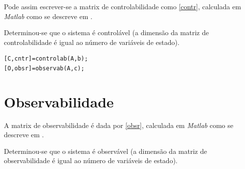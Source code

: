 \documentclass[%
  reprint,
  nofootinbib,
  amsmath,amssymb,
  aps,
  10pt,
  a4paper
]{revtex4-1}
\begin{document}

Pode assim escrever-se a matrix de controlabilidade como \eqref{contr}, calculada em {\it Matlab} como se descreve em .


Determinou-se que o sistema é controlável (a dimensão da matriz de controlabilidade é igual ao número de variáveis de estado).

\begin{lstlisting}[label=list1, caption={Código Matlab para o cálculo da matrix de controlabilidade $\mathcal{C}$ e de observabilidade $\mathcal{O}$. As variáveis {\it cntr} e {\it obsr} adquirem valores booleanos, que indicam se o sistema é controlável e/ou observável, respectivamente. As funções {\it controlab} e {\it observab} apresentam-se em anexo em ficheiros com o mesmo nome.}]
[C,cntr]=controlab(A,b);
[O,obsr]=observab(A,c);
\end{lstlisting}


\section{Observabilidade}
A matrix de observabilidade é dada por \eqref{obsr}, calculada em {\it Matlab} como se descreve em .


Determinou-se que o sistema é observável (a dimensão da matriz de observabilidade é igual ao número de variáveis de estado).
\end{document}
